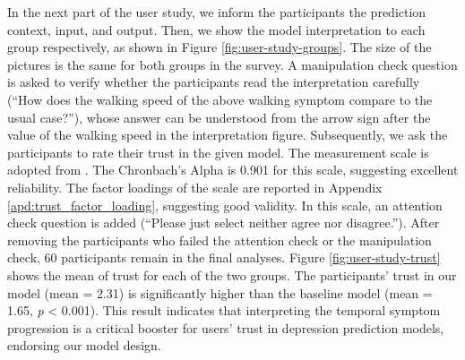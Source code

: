 \documentclass[mnsc]{informs3b} %
\begin{document}
In the next part of the user study, we inform the participants the prediction context, input, and output. Then, we show the model interpretation to each group respectively, as shown in Figure \ref{fig:user-study-groups}. The size of the pictures is the same for both groups in the survey. A manipulation check question is asked to verify whether the participants read the interpretation carefully (``How does the walking speed of the above walking symptom compare to the usual case?''), whose answer can be understood from the arrow sign after the value of the walking speed in the interpretation figure. Subsequently, we ask the participants to rate their trust in the given model. The measurement scale is adopted from \cite{chai_factors_2011}. The Chronbach's Alpha is 0.901 for this scale, suggesting excellent reliability. The factor loadings of the scale are reported in Appendix \ref{apd:trust_factor_loading}, suggesting good validity. In this scale, an attention check question is added (``Please just select neither agree nor disagree.''). After removing the participants who failed the attention check or the manipulation check, 60 participants remain in the final analyses. Figure \ref{fig:user-study-trust} shows the mean of trust for each of the two groups. The participants' trust in our model (mean = 2.31) is significantly higher than the baseline model (mean = 1.65, \textit{p} < 0.001). This result indicates that interpreting the temporal symptom progression is a critical booster for users' trust in depression prediction models, endorsing our model design.
 
\end{document}
